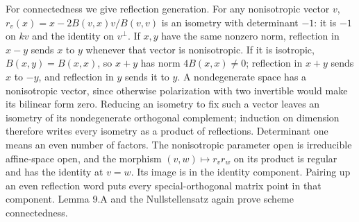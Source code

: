 \documentclass[11pt,a4paper,openany]{report}
\begin{document}
For connectedness we give reflection generation. For any nonisotropic vector \(v\), \(r_v(x)=x-2B(v,x)v/B(v,v)\) is an isometry with determinant \(-1\): it is \(-1\) on \(kv\) and the identity on \(v^\perp\). If \(x,y\) have the same nonzero norm, reflection in \(x-y\) sends \(x\) to \(y\) whenever that vector is nonisotropic. If it is isotropic, \(B(x,y)=B(x,x)\), so \(x+y\) has norm \(4B(x,x)\ne0\); reflection in \(x+y\) sends \(x\) to \(-y\), and reflection in \(y\) sends it to \(y\). A nondegenerate space has a nonisotropic vector, since otherwise polarization with two invertible would make its bilinear form zero. Reducing an isometry to fix such a vector leaves an isometry of its nondegenerate orthogonal complement; induction on dimension therefore writes every isometry as a product of reflections. Determinant one means an even number of factors. The nonisotropic parameter open is irreducible affine-space open, and the morphism \((v,w)\mapsto r_vr_w\) on its product is regular and has the identity at \(v=w\). Its image is in the identity component. Pairing up an even reflection word puts every special-orthogonal matrix point in that component. Lemma 9.A and the Nullstellensatz again prove scheme connectedness.
\end{document}
